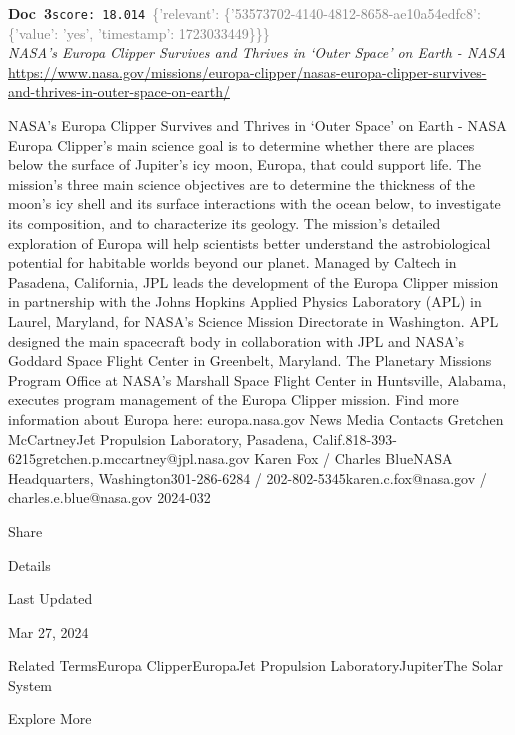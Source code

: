 \documentclass[a4paper,11pt]{article}
\begin{document}
\begin{docenv}
{\footnotesize\textcolor{doccolor}{\textbf{Doc~3}}}\hfill{\tiny\texttt{score:~18.014}}\ {\tiny\textcolor{gray}{\{'relevant': \{'53573702-4140-4812-8658-ae10a54edfc8': \{'value': 'yes', 'timestamp': 1723033449\}\}\}}}\\[3pt]
{\small\textit{NASA’s Europa Clipper Survives and Thrives in ‘Outer Space’ on Earth - NASA}}\\[2pt]
{\tiny\url{https://www.nasa.gov/missions/europa-clipper/nasas-europa-clipper-survives-and-thrives-in-outer-space-on-earth/}}\\[4pt]
{\footnotesize NASA’s Europa Clipper Survives and Thrives in ‘Outer Space’ on Earth - NASA
Europa Clipper’s main science goal is to determine whether there are places below the surface of Jupiter’s icy moon, Europa, that could support life. The mission’s three main science objectives are to determine the thickness of the moon’s icy shell and its surface interactions with the ocean below, to investigate its composition, and to characterize its geology. The mission’s detailed exploration of Europa will help scientists better understand the astrobiological potential for habitable worlds beyond our planet.
Managed by Caltech in Pasadena, California, JPL leads the development of the Europa Clipper mission in partnership with the Johns Hopkins Applied Physics Laboratory (APL) in Laurel, Maryland, for NASA’s Science Mission Directorate in Washington. APL designed the main spacecraft body in collaboration with JPL and NASA’s Goddard Space Flight Center in Greenbelt, Maryland. The Planetary Missions Program Office at NASA’s Marshall Space Flight Center in Huntsville, Alabama, executes program management of the Europa Clipper mission.
Find more information about Europa here:
europa.nasa.gov
News Media Contacts
Gretchen McCartneyJet Propulsion Laboratory, Pasadena, Calif.818-393-6215gretchen.p.mccartney@jpl.nasa.gov
Karen Fox / Charles BlueNASA Headquarters, Washington301-286-6284 / 202-802-5345karen.c.fox@nasa.gov / charles.e.blue@nasa.gov
2024-032

Share

Details

Last Updated

Mar 27, 2024

Related TermsEuropa ClipperEuropaJet Propulsion LaboratoryJupiterThe Solar System

 

Explore More

 

}
\end{docenv}
\end{document}
